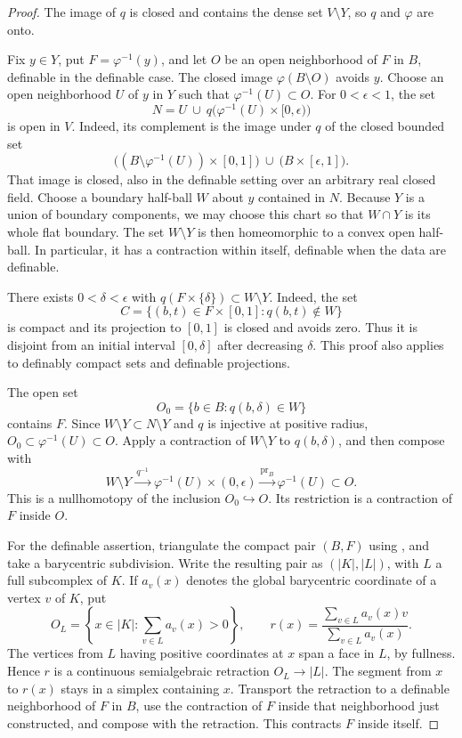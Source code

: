 \begin{proof}
The image of $q$ is closed and contains the dense set
$V\setminus Y$, so $q$ and $\varphi$ are onto.  

Fix $y\in Y$, put $F=\varphi^{-1}(y)$, and let $O$ be an open
neighborhood of $F$ in $B$, definable in the definable case.
The closed image $\varphi(B\setminus O)$ avoids $y$.  Choose an
open neighborhood $U$ of $y$ in $Y$ such that
$\varphi^{-1}(U)\subset O$.  For $0<\epsilon<1$, the set
\[
 N=U\ \cup\ q\bigl(\varphi^{-1}(U)\times[0,\epsilon)\bigr)
\]
is open in $V$. Indeed, its complement is the image under $q$ of
the closed bounded set
\[
 \bigl((B\setminus\varphi^{-1}(U))\times[0,1]\bigr)
 \ \cup\ \bigl(B\times[\epsilon,1]\bigr).
\]
That image is closed, also in the definable setting over an
arbitrary real closed field.  Choose a boundary half-ball $W$ about $y$ contained in $N$.
Because $Y$ is a union of boundary components, we may choose this
chart so that $W\cap Y$ is its whole flat boundary.  The set
$W\setminus Y$ is then homeomorphic to a convex open half-ball.
In particular, it has a contraction within itself, definable when
the data are definable.

There exists $0<\delta<\epsilon$ with
$q(F\times\{\delta\})\subset W\setminus Y$.  Indeed, the set
\[
 C=\{(b,t)\in F\times[0,1]:q(b,t)\notin W\}
\]
is compact and its projection to $[0,1]$ is closed and avoids zero.
Thus it is disjoint from an initial interval $[0,\delta]$ after
decreasing $\delta$.  This proof also applies to definably compact
sets and definable projections.

The open set
\[
 O_0=\{b\in B:q(b,\delta)\in W\}
\]
contains $F$.  Since $W\setminus Y\subset N\setminus Y$ and $q$
is injective at positive radius, $O_0\subset\varphi^{-1}(U)\subset O$.
Apply a contraction of $W\setminus Y$ to $q(b,\delta)$, and then
compose with
\[
 W\setminus Y\xrightarrow{\ q^{-1}\ }
 \varphi^{-1}(U)\times(0,\epsilon)
 \xrightarrow{\operatorname{pr}_B}\varphi^{-1}(U)\subset O.
\]
This is a nullhomotopy of the inclusion $O_0\hookrightarrow O$.
Its restriction is a contraction of $F$ inside $O$.

For the definable assertion, triangulate the compact pair $(B,F)$
using \cite[Theorem~2.2(1), p.~6]{Shiota2010}, and take a barycentric
subdivision.  Write the resulting pair as $(|K|,|L|)$, with $L$ a
full subcomplex of $K$.  If $a_v(x)$ denotes the global barycentric
coordinate of a vertex $v$ of $K$, put
\[
 O_L=\left\{x\in|K|:\sum_{v\in L}a_v(x)>0\right\},\qquad
 r(x)=\frac{\sum_{v\in L}a_v(x)v}{\sum_{v\in L}a_v(x)}.
\]
The vertices from $L$ having positive coordinates at $x$ span a
face in $L$, by fullness.  Hence $r$ is a continuous semialgebraic
retraction $O_L\longrightarrow|L|$.  The segment from $x$ to $r(x)$
stays in a simplex containing $x$.  Transport the retraction to
a definable neighborhood of $F$ in $B$, use the contraction of $F$
inside that neighborhood just constructed, and compose with the
retraction.  This contracts $F$ inside itself.


\end{proof}
